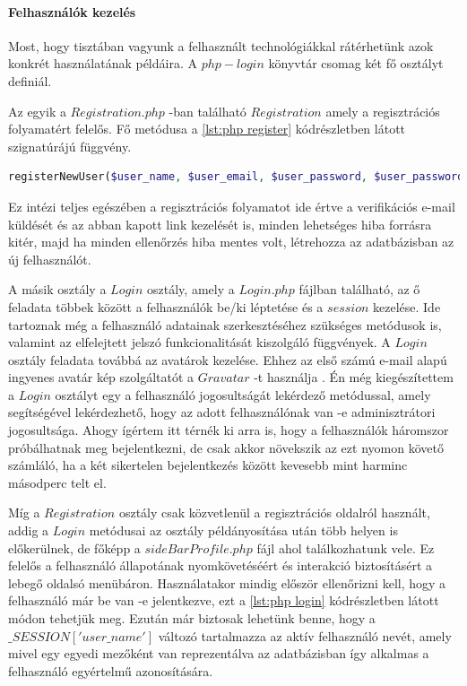 \documentclass[12pt]{report}
\theoremstyle{definition}
\begin{document}
	\paragraph{Felhasználók kezelés}
	Most, hogy tisztában vagyunk a felhasznált technológiákkal rátérhetünk azok konkrét használatának példáira. A $php-login$ könyvtár csomag két fő osztályt definiál. 
	
	Az egyik a $Registration.php$ -ban található $Registration$ amely a regisztrációs folyamatért felelős. Fő metódusa a \ref{lst:php register} kódrészletben látott szignatúrájú függvény.
	
	\noindent\begin{minipage}{\linewidth}
		\begin{lstlisting}[language=php,label={lst:php register}, caption={php-login registerNewUser szignatúra}]
registerNewUser($user_name, $user_email, $user_password, $user_password_repeat, $captcha)
		\end{lstlisting}
	\end{minipage}
	
	Ez intézi teljes egészében a regisztrációs folyamatot ide értve a verifikációs e-mail küldését és az abban kapott link kezelését is, minden lehetséges hiba forrásra kitér, majd ha minden ellenőrzés hiba mentes volt, létrehozza az adatbázisban az új felhasználót.
	
	A másik osztály a $Login$ osztály, amely a $Login.php$ fájlban található, az ő feladata többek között a felhasználók be/ki léptetése és a $session$ kezelése. Ide tartoznak még a felhasználó adatainak szerkesztéséhez szükséges metódusok is, valamint az elfelejtett jelszó funkcionalitását kiszolgáló függvények. A $Login$ osztály feladata továbbá az avatárok kezelése. Ehhez az első számú e-mail alapú ingyenes avatár kép szolgáltatót a $Gravatar$ -t használja \cite{Gravatar}. Én még kiegészítettem a $Login$ osztályt egy a felhasználó jogosultságát lekérdező metódussal, amely segítségével lekérdezhető, hogy az adott felhasználónak van -e adminisztrátori jogosultsága. Ahogy ígértem itt térnék ki arra is, hogy a felhasználók háromszor próbálhatnak meg bejelentkezni, de csak akkor növekszik az ezt nyomon követő számláló, ha a két sikertelen bejelentkezés között kevesebb mint harminc másodperc telt el.
	
	Míg a $Registration$ osztály csak közvetlenül a regisztrációs oldalról használt, addig a $Login$ metódusai az osztály példányosítása után több helyen is előkerülnek, de főképp a $sideBarProfile.php$ fájl ahol találkozhatunk vele. Ez felelős a felhasználó állapotának nyomkövetéséért és interakció biztosításért a lebegő oldalsó menübáron. Használatakor mindig először ellenőrizni kell, hogy a felhasználó már be van -e jelentkezve, ezt a \ref{lst:php login} kódrészletben látott módon tehetjük meg. Ezután már biztosak lehetünk benne, hogy a $\_SESSION\left['user\_name'\right]$ változó tartalmazza az aktív felhasználó nevét, amely mivel egy egyedi mezőként van reprezentálva az adatbázisban így alkalmas a felhasználó egyértelmű azonosítására.
	
\end{document}
